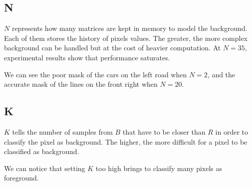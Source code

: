 \subsection*{N}
$N$ represents how many matrices are kept in memory to model the background.
Each of them stores the history of pixels values.
The greater, the more complex background can be handled but at the cost of heavier
computation. At $N=35$, experimental results show that performance saturates.
\begin{figure}[!t]
\centering
{}
\end{figure}
We can see the poor mask of the cars on the left road when $N=2$, and the
accurate mask of the lines on the front right when $N=20$.


\subsection*{K}
$K$ tells the number of samples from $B$ that have to be closer than $R$ in order to
classify the pixel as background. The higher, the more difficult for a pixel to be
classified as background.
\begin{figure}[!t]
\centering
{}
\end{figure}
We can notice that setting $K$ too high brings to classify many pixels as foreground.


